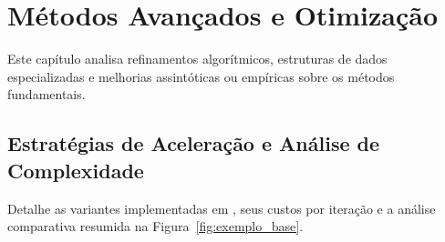 \chapter{Métodos Avançados e Otimização}\label{sec:metodos_avancados}

Este capítulo analisa refinamentos algorítmicos, estruturas de dados especializadas e melhorias assintóticas ou empíricas sobre os métodos fundamentais.

\section{Estratégias de Aceleração e Análise de Complexidade}

Detalhe as variantes implementadas em , seus custos por iteração e a análise comparativa resumida na Figura~\ref{fig:exemplo_base}.
